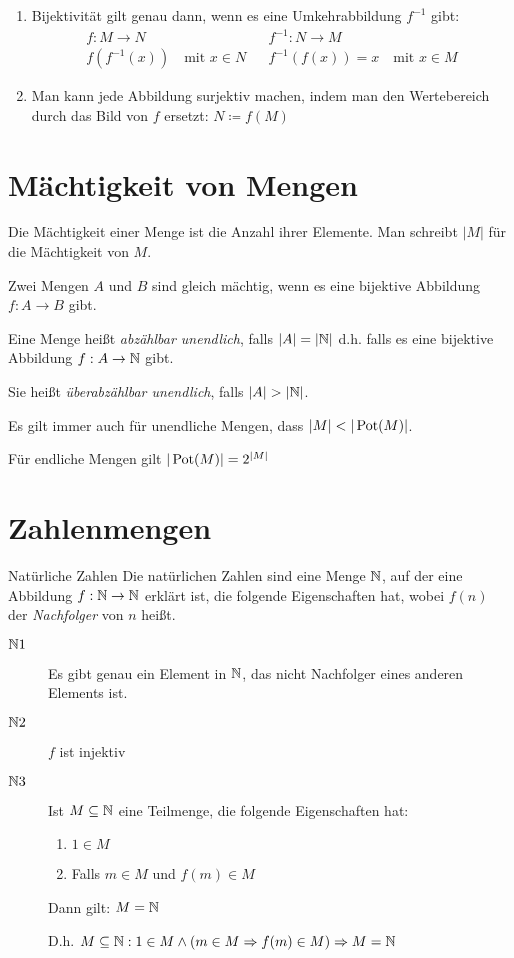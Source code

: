 \bemerkung
\begin{enumerate}
  \item Bijektivität gilt genau dann, wenn es eine Umkehrabbildung $f^{-1}$ gibt:
  \begin{align*}
    f:M\rightarrow N && f^{-1}:N\rightarrow M\\
    f\left(f^{-1}(x)\right) \quad\text{mit }x\in N && f^{-1}\left(f(x)\right)=x \quad\text{mit }x\in M
  \end{align*}
  \item Man kann jede Abbildung surjektiv machen, indem man den Wertebereich durch das Bild von $f$ ersetzt: $N\coloneqq f(M)$
\end{enumerate}

\section{Mächtigkeit von Mengen}
Die Mächtigkeit einer Menge ist die Anzahl ihrer Elemente. Man schreibt $|M|$ für die Mächtigkeit von $M$.

Zwei Mengen $A$ und $B$ sind gleich mächtig, wenn es eine bijektive Abbildung $f:A\rightarrow B$ gibt.

Eine Menge heißt \emph{abzählbar unendlich}, falls $|A|=|\mathbb{N}|$ d.h. falls es eine bijektive Abbildung $f:A\rightarrow \mathbb{N}$ gibt.

Sie heißt \emph{überabzählbar unendlich}, falls $|A|>|\N|$.

Es gilt immer auch für unendliche Mengen, dass $|M| < |\operatorname{Pot}(M)|$.

Für endliche Mengen gilt $|\operatorname{Pot}(M)| = 2^{|M|}$



\section{Zahlenmengen}
\begin{definition}{Natürliche Zahlen}
	Die natürlichen Zahlen sind eine Menge $\mathbb{N}$, auf der eine Abbildung $f:\mathbb{N}\rightarrow\mathbb{N}$ erklärt ist, die folgende Eigenschaften hat, wobei $f(n)$ der \emph{Nachfolger} von $n$ heißt.
	\begin{description}
	  \item[$\mathbb{N} 1$] Es gibt genau ein Element in $\mathbb{N}$, das nicht Nachfolger eines anderen Elements ist.
	  \item[$\mathbb{N} 2$] $f$ ist injektiv
	  \item[$\mathbb{N} 3$] Ist $M\subseteq \mathbb{N}$ eine Teilmenge, die folgende Eigenschaften hat:
	  \begin{enumerate}
	    \item $1\in M$
	    \item Falls $m\in M$ und $f(m)\in M$
	  \end{enumerate}
	  Dann gilt: $M = \mathbb{N}$

	  D.h. $M\subseteq \mathbb{N} : 1\in M \wedge (m\in M \Rightarrow f(m)\in M) \Rightarrow M=\mathbb{N}$
	\end{description}
\end{definition}


